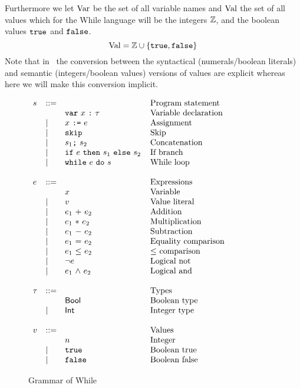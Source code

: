 Furthermore we let $\mbox{$\mathrm{Var}$}$ be the set of all variable names and $\mbox{$\mathrm{Val}$}$ the
set of all values which for the While language will be the integers $\mathbb{Z}$,
and the boolean values $\mbox{\texttt{true}}$ and $\mbox{\texttt{false}}$. 
\begin{equation*}
  \mbox{$\mathrm{Val}$} = \mathbb{Z} \cup \left\{ \mbox{\texttt{true}}, \mbox{\texttt{false}} \right\}
\end{equation*}
Note that in~\cite{} %
the conversion between the syntactical (numerals\slash boolean literals) and semantic
(integers\slash boolean values) versions of values are explicit whereas here we will
make this conversion implicit.

\begin{figure}[h]
  \centering
  $\begin{array}{lll@{\hspace{4mm}}l}
    s &::= & & \mbox{Program statement} \\
    &  & \WhDecl{x}{\tau} & \mbox{Variable declaration} \\
    &| & \WhAssign{x}{e} & \mbox{Assignment} \\
    &| & \WhSkip & \mbox{Skip} \\
    &| & \WhConc{s_1}{s_2} & \mbox{Concatenation} \\
    &| & \WhIf{e}{s_1}{s_2} & \mbox{If branch} \\
    &| & \WhWhile{e}{s} & \mbox{While loop} \\
    &&&\\
    e & ::= & & \mbox{Expressions} \\
    & & x & \mbox{Variable} \\
    &| & v & \mbox{Value literal} \\
    &| & \WhAdd{e_1}{e_2} & \mbox{Addition} \\
    &| & \WhTimes{e_1}{e_2} & \mbox{Multiplication} \\
    &| & \WhMinus{e_1}{e_2} & \mbox{Subtraction} \\
    &| & \WhEq{e_1}{e_2} & \mbox{Equality comparison} \\
    &| & \WhLeq{e_1}{e_2} & \mbox{$\leq$ comparison} \\
    &| & \WhLnot{e} & \mbox{Logical not} \\
    &| & \WhLand{e_1}{e_2} & \mbox{Logical and} \\
    &&&\\
    \tau & ::= & & \mbox{Types} \\
    & & \WhBool & \mbox{Boolean type} \\
    &| & \WhInt & \mbox{Integer type} \\
    &&&\\
    v & ::= & & \mbox{Values} \\
    &  & n & \mbox{Integer} \\
    &| & \WhTrue & \mbox{Boolean true} \\
    &| & \WhFalse & \mbox{Boolean false} \\
  \end{array}$
  \caption{Grammar of While}
  \label{fig:while_grammar}
\end{figure}

